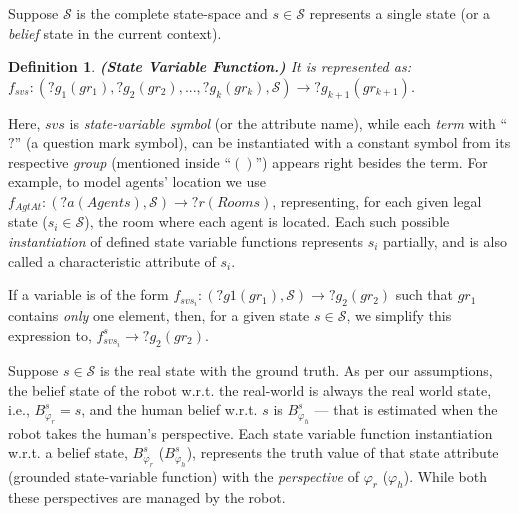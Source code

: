 \documentclass[letterpaper]{article} %
\newtheorem{definition}{Definition}
\begin{document}
Suppose $\mathcal{S}$ is the complete state-space and $s \in \mathcal{S}$ represents a single state (or a \textit{belief} state in the current context).  


\begin{definition}
\textbf{(State Variable Function.)} It is represented as: $f_{svs}:(?g_1 (gr_1), ?g_2 (gr_2), ..., ?g_k (gr_k),\mathcal{S})\rightarrow ?g_{k+1} (gr_{k+1})$. 
\end{definition}
Here, $svs$ is \textit{state-variable symbol} (or the attribute name), while each \textit{term} with ``$?$'' (a question mark symbol), can be instantiated with a constant symbol from its respective \textit{group} (mentioned inside ``$()$'') appears right besides the term. 
For example, to model agents' location we use $f_{\textit{AgtAt}}:(?a (Agents), \mathcal{S}) \rightarrow ?r (Rooms)$, representing, for each given legal state ($s_i \in \mathcal{S}$), the room where each agent is located. 
Each such possible \textit{instantiation} of defined state variable functions represents $s_i$ partially, and is also called a characteristic attribute of $s_i$.     

If a variable is of the form $f_{svs_i}: (?g1 (gr_1), \mathcal{S}) \rightarrow ?g_2 (gr_2)$ such that $gr_1$ contains \textit{only} one element, then, for a given state $s \in \mathcal{S}$, we simplify this expression to, $f_{svs_i}^{s} \rightarrow ?g_2 (gr_2)$. 

Suppose $s \in \mathcal{S}$ is the real state with the ground truth. As per our assumptions, the belief state of the robot w.r.t. the real-world is always the real world state, i.e., $B_{\varphi_r}^s = s$, and the human belief w.r.t. $s$ is $B_{\varphi_h}^s$ --- that is estimated when the robot takes the human's perspective. Each state variable function instantiation w.r.t. a belief state, $B_{\varphi_r}^s$ ($B_{\varphi_h}^s$), represents the truth value of that state attribute 
(grounded state-variable function)
with the \textit{perspective} of 
$\varphi_r$ ($\varphi_h$). While both these perspectives are managed by the robot.
\end{document}
